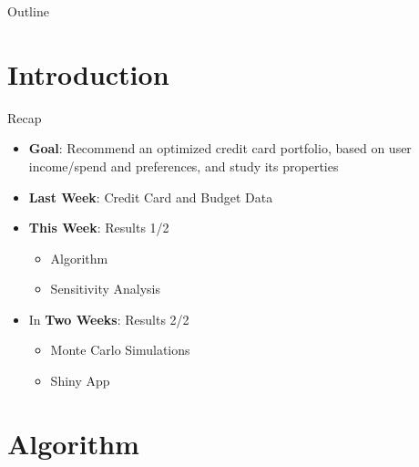 


\begin{frame}{Outline}
    \tableofcontents
\end{frame}

\section{Introduction}

\begin{frame}{Recap}
        \begin{itemize}
            \item {\bf Goal}: Recommend an optimized credit card portfolio, based on user income/spend and preferences, and study its properties
            \bigskip
            \item {\bf Last Week}: Credit Card and Budget Data
            \bigskip
            \item {\bf This Week}: Results 1/2
            \begin{itemize}
                \item Algorithm
                \item Sensitivity Analysis
            \end{itemize}
            \bigskip
            \item In {\bf Two Weeks}: Results 2/2
            \begin{itemize}
                \item Monte Carlo Simulations
                \item Shiny App
            \end{itemize}
        \end{itemize}
    \end{frame} 
    

\section{Algorithm}

